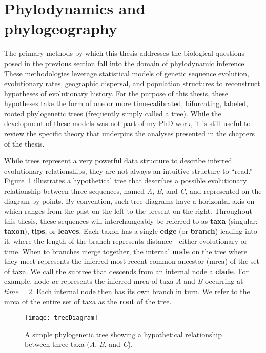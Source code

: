 \section{Phylodynamics and phylogeography}
The primary methods by which this thesis addresses the biological questions posed in the previous section fall into the domain of phylodynamic inference.
These methodologies leverage statistical models of genetic sequence evolution, evolutionary rates, geographic dispersal, and population structures to reconstruct hypotheses of evolutionary history.
For the purpose of this thesis, these hypotheses take the form of one or more time-calibrated, bifurcating, labeled, rooted phylogenetic trees (frequently simply called a tree).
While the development of these models was not part of my PhD work, it is still useful to review the specific theory that underpins the analyses presented in the chapters of the thesis.

While trees represent a very powerful data structure to describe inferred evolutionary relationships, they are not always an intuitive structure to ``read.''
Figure~\ref{fig:treeDiagram} illustrates a hypothetical tree that describes a possible evolutionary relationship between three sequences, named \textit{A}, \textit{B}, and \textit{C}, and represented on the diagram by points.
By convention, such tree diagrams have a horizontal axis on which ranges from the past on the left to the present on the right.
Throughout this thesis, these sequences will interchangeably be referred to as \textbf{taxa} (singular: \textbf{taxon}), \textbf{tips}, or \textbf{leaves}.
Each taxon has a single \textbf{edge} (or \textbf{branch}) leading into it, where the length of the branch represents distance---either evolutionary or time.
When to branches merge together, the internal \textbf{node} on the tree where they meet represents the inferred most recent common ancestor (\gls{mrca}) of the set of taxa.
We call the subtree that descends from an internal node a \textbf{clade}.
For example, node \textit{ac} represents the inferred \gls{mrca} of taxa \textit{A} and \textit{B} occurring at $time=2$.
Each internal node then has its own branch in turn.
We refer to the \gls{mrca} of the entire set of taxa as the \textbf{root} of the tree. 

\begin{figure}[ht]
  \centering
  \texttt{[image: treeDiagram]}
  \caption[Example phylogenetic tree]{A simple phylogenetic tree showing a hypothetical relationship between three taxa (\textit{A}, \textit{B}, and \textit{C}).
  }
  \label{fig:treeDiagram}
\end{figure}

